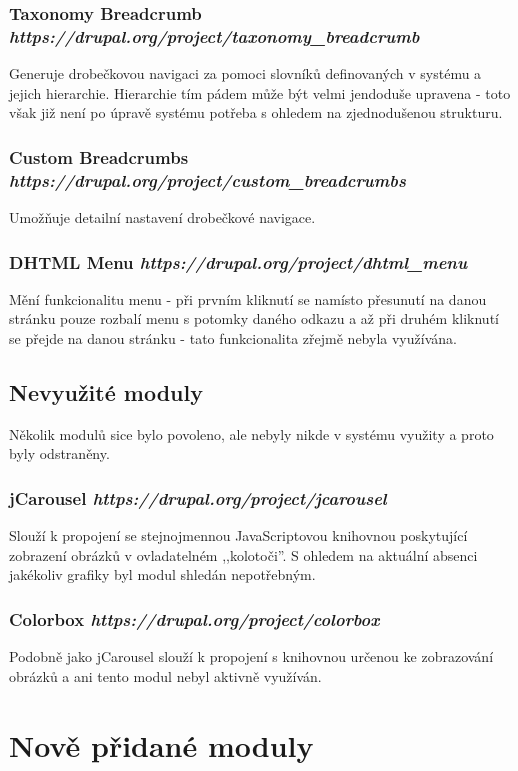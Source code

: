 \subsubsection*{Taxonomy Breadcrumb \hfill \emph{https://drupal.org/project/taxonomy\_breadcrumb}}
Generuje drobečkovou navigaci za pomoci slovníků definovaných v systému a jejich hierarchie. Hierarchie tím pádem může být velmi jendoduše upravena - toto však již není po úpravě systému potřeba s ohledem na zjednodušenou strukturu.

\subsubsection*{Custom Breadcrumbs \hfill \emph{https://drupal.org/project/custom\_breadcrumbs}}
Umožňuje detailní nastavení drobečkové navigace.

\subsubsection*{DHTML Menu \hfill \emph{https://drupal.org/project/dhtml\_menu}}
Mění funkcionalitu menu - při prvním kliknutí se namísto přesunutí na danou stránku pouze rozbalí menu s potomky daného odkazu a až při druhém kliknutí se přejde na danou stránku - tato funkcionalita zřejmě nebyla využívána.

\subsection{Nevyužité moduly}
Několik modulů sice bylo povoleno, ale nebyly nikde v systému využity a proto byly odstraněny.

\subsubsection*{jCarousel \hfill \emph{https://drupal.org/project/jcarousel}}
Slouží k propojení se stejnojmennou JavaScriptovou knihovnou poskytující zobrazení obrázků v ovladatelném ,,kolotoči''. S ohledem na aktuální absenci jakékoliv grafiky byl modul shledán nepotřebným.
 
\subsubsection*{Colorbox \hfill \emph{https://drupal.org/project/colorbox}}
Podobně jako jCarousel slouží k propojení s knihovnou určenou ke zobrazování obrázků a ani tento modul nebyl aktivně využíván.

\section{Nově přidané moduly}

